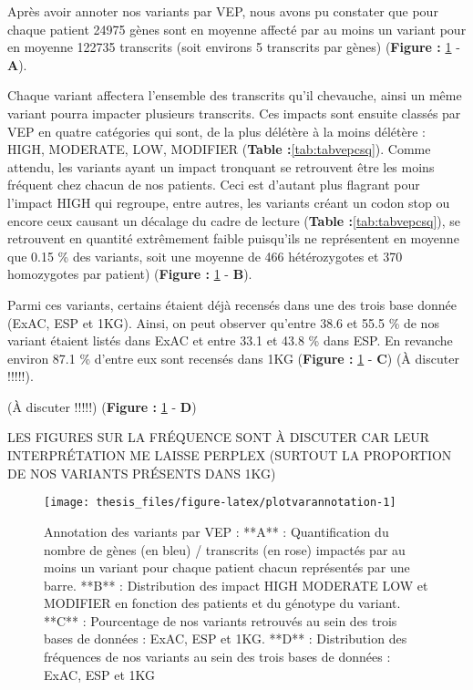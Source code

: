 \documentclass[12pt,twoside]{reedthesis}
\theoremstyle{definition}
\theoremstyle{definition}
\theoremstyle{remark}
\begin{document}
  Après avoir annoter nos variants par VEP, nous avons pu constater que
  pour chaque patient 24975 gènes sont en moyenne affecté par au moins un
  variant pour en moyenne 122735 transcrits (soit environs 5 transcrits
  par gènes) (\textbf{Figure : }\ref{fig:plotvarannotation} - \textbf{A}).
  
  Chaque variant affectera l'ensemble des transcrits qu'il chevauche,
  ainsi un même variant pourra impacter plusieurs transcrits. Ces impacts
  sont ensuite classés par VEP en quatre catégories qui sont, de la plus
  délétère à la moins délétère : HIGH, MODERATE, LOW, MODIFIER
  (\textbf{Table :}\ref{tab:tabvepcsq}). Comme attendu, les variants ayant
  un impact tronquant se retrouvent être les moins fréquent chez chacun de
  nos patients. Ceci est d'autant plus flagrant pour l'impact HIGH qui
  regroupe, entre autres, les variants créant un codon stop ou encore ceux
  causant un décalage du cadre de lecture (\textbf{Table
  :}\ref{tab:tabvepcsq}), se retrouvent en quantité extrêmement faible
  puisqu'ils ne représentent en moyenne que 0.15 \% des variants, soit une
  moyenne de 466 hétérozygotes et 370 homozygotes par patient)
  (\textbf{Figure : }\ref{fig:plotvarannotation} - \textbf{B}).
  
  Parmi ces variants, certains étaient déjà recensés dans une des trois
  base donnée (ExAC, ESP et 1KG). Ainsi, on peut observer qu'entre 38.6 et
  55.5 \% de nos variant étaient listés dans ExAC et entre 33.1 et 43.8 \%
  dans ESP. En revanche environ 87.1 \% d'entre eux sont recensés dans 1KG
  (\textbf{Figure : }\ref{fig:plotvarannotation} - \textbf{C}) (À discuter
  !!!!!).
  
  (À discuter !!!!!) (\textbf{Figure : }\ref{fig:plotvarannotation} -
  \textbf{D})
  
  LES FIGURES SUR LA FRÉQUENCE SONT À DISCUTER CAR LEUR INTERPRÉTATION ME
  LAISSE PERPLEX (SURTOUT LA PROPORTION DE NOS VARIANTS PRÉSENTS DANS 1KG)
  
  \newpage
  
  \begin{figure}
  
  {\centering \texttt{[image: thesis\_files/figure-latex/plotvarannotation-1]} 
  
  }
  
  \caption[Annotation des variants par VEP]{Annotation des variants par VEP : **A** : Quantification du nombre de gènes (en bleu) / transcrits (en rose) impactés par au moins un variant pour chaque patient chacun représentés par une barre. **B** : Distribution des impact HIGH MODERATE LOW et MODIFIER en fonction des patients et du génotype du variant. **C** : Pourcentage de nos variants retrouvés au sein des trois bases de données : ExAC, ESP et 1KG. **D** : Distribution des fréquences de nos variants au sein des trois bases de données : ExAC, ESP et 1KG}\label{fig:plotvarannotation}
  \end{figure}
  
\end{document}
